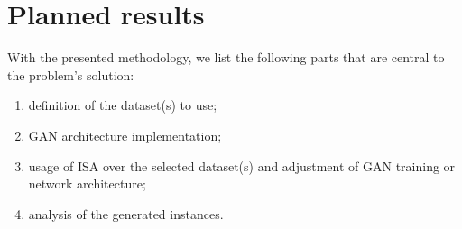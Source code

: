 \section{Planned results}

With the presented methodology, we list the following parts that are central to the problem's solution:

\begin{enumerate}[label=\Alph*.]
	\item definition of the dataset(s) to use;
	\item GAN architecture implementation;
	\item usage of ISA over the selected dataset(s) and adjustment of GAN training or network architecture;
	\item analysis of the generated instances.
\end{enumerate}